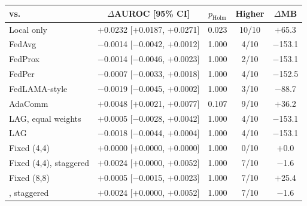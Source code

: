 \begin{tabular}{@{}lcccc@{}}
\toprule
\tierfed{} vs. & $\Delta$AUROC [95\% CI] & $p_{\mathrm{Holm}}$ & Higher & $\Delta$MB\\
\midrule
Local only & \ensuremath{+}0.0232 [\ensuremath{+}0.0187, \ensuremath{+}0.0271] & 0.023 & 10/10 & \ensuremath{+}65.3\\
FedAvg & \ensuremath{-}0.0014 [\ensuremath{-}0.0042, \ensuremath{+}0.0012] & 1.000 & 4/10 & \ensuremath{-}153.1\\
FedProx & \ensuremath{-}0.0014 [\ensuremath{-}0.0046, \ensuremath{+}0.0023] & 1.000 & 2/10 & \ensuremath{-}153.1\\
FedPer & \ensuremath{-}0.0007 [\ensuremath{-}0.0033, \ensuremath{+}0.0018] & 1.000 & 4/10 & \ensuremath{-}152.5\\
FedLAMA-style & \ensuremath{-}0.0019 [\ensuremath{-}0.0045, \ensuremath{+}0.0002] & 1.000 & 3/10 & \ensuremath{-}88.7\\
AdaComm & \ensuremath{+}0.0048 [\ensuremath{+}0.0021, \ensuremath{+}0.0077] & 0.107 & 9/10 & \ensuremath{+}36.2\\
LAG, equal weights & \ensuremath{+}0.0005 [\ensuremath{-}0.0028, \ensuremath{+}0.0042] & 1.000 & 4/10 & \ensuremath{-}153.1\\
LAG & \ensuremath{-}0.0018 [\ensuremath{-}0.0044, \ensuremath{+}0.0004] & 1.000 & 4/10 & \ensuremath{-}153.1\\
Fixed (4,4) & \ensuremath{+}0.0000 [\ensuremath{+}0.0000, \ensuremath{+}0.0000] & 1.000 & 0/10 & \ensuremath{+}0.0\\
Fixed (4,4), staggered & \ensuremath{+}0.0024 [\ensuremath{+}0.0000, \ensuremath{+}0.0052] & 1.000 & 7/10 & \ensuremath{-}1.6\\
Fixed (8,8) & \ensuremath{+}0.0005 [\ensuremath{-}0.0015, \ensuremath{+}0.0023] & 1.000 & 7/10 & \ensuremath{+}25.4\\
\tierfed{}, staggered & \ensuremath{+}0.0024 [\ensuremath{+}0.0000, \ensuremath{+}0.0052] & 1.000 & 7/10 & \ensuremath{-}1.6\\
\bottomrule
\end{tabular}
